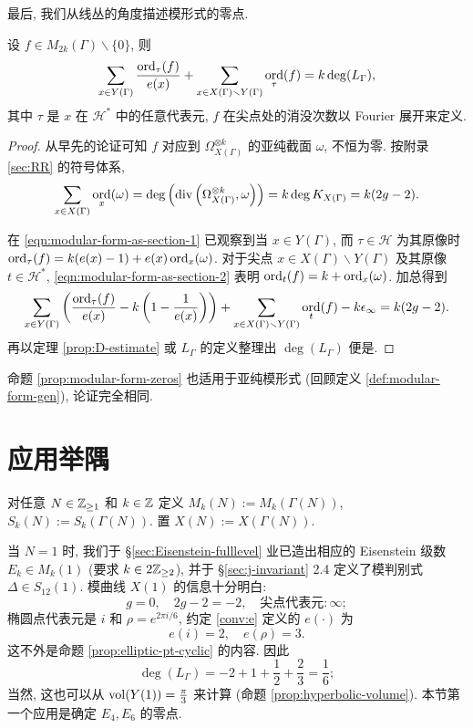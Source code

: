 最后, 我们从线丛的角度描述模形式的零点.
\begin{proposition}\label{prop:modular-form-zeros}
	设 $f \in M_{2k}(\Gamma) \smallsetminus \{0\}$, 则
	\[ \sum_{x \in Y(\Gamma)} \dfrac{\operatorname*{ord}_\tau(f)}{e(x)} + \sum_{x \in X(\Gamma) \smallsetminus Y(\Gamma)} \operatorname*{ord}_\tau(f) = k \deg(L_\Gamma), \]
	其中 $\tau$ 是 $x$ 在 $\mathcal{H}^*$ 中的任意代表元, $f$ 在尖点处的消没次数以 Fourier 展开来定义.
\end{proposition}
\begin{proof}
	从早先的论证可知 $f$ 对应到 $\Omega_{X(\Gamma)}^{\otimes k}$ 的亚纯截面 $\omega$, 不恒为零. 按附录 \ref{sec:RR} 的符号体系,
	\[ \sum_{x \in X(\Gamma)} \operatorname*{ord}_x(\omega) = \deg \left(\operatorname{div}\left( \Omega_{X(\Gamma)}^{\otimes k}, \omega \right)\right) = k \deg K_{X(\Gamma)} = k(2g-2). \]

	在 \eqref{eqn:modular-form-as-section-1} 已观察到当 $x \in Y(\Gamma)$, 而 $\tau \in \mathcal{H}$ 为其原像时 $\operatorname*{ord}_\tau(f) = k(e(x)-1) + e(x) \operatorname*{ord}_x(\omega)$. 对于尖点 $x \in X(\Gamma) \smallsetminus Y(\Gamma)$ 及其原像 $t \in \mathcal{H}^*$, \eqref{eqn:modular-form-as-section-2} 表明 $\operatorname*{ord}_t(f) = k + \operatorname*{ord}_x(\omega)$. 加总得到
	\[ \sum_{x \in Y(\Gamma)} \left( \dfrac{\operatorname*{ord}_\tau(f)}{e(x)} - k\left( 1 - \dfrac{1}{e(x)} \right)\right) + \sum_{x \in X(\Gamma) \smallsetminus Y(\Gamma)} \operatorname*{ord}_t(f) - k \epsilon_\infty = k(2g - 2). \]
	再以定理 \ref{prop:D-estimate} 或 $L_\Gamma$ 的定义整理出 $\deg(L_\Gamma)$ 便是.
\end{proof}

命题 \ref{prop:modular-form-zeros} 也适用于亚纯模形式 (回顾定义 \ref{def:modular-form-gen}), 论证完全相同.

\section{应用举隅}\label{sec:dimension-full}
对任意 $N \in \mathbb{Z}_{\geq 1}$ 和 $k \in \mathbb{Z}$ 定义 $M_k(N) := M_k(\Gamma(N))$, $S_k(N) := S_k(\Gamma(N))$. 置 $X(N) := X(\Gamma(N))$.

当 $N=1$ 时, 我们于 \S\ref{sec:Eisenstein-fulllevel} 业已造出相应的 Eisenstein 级数 $E_k \in M_k(1)$ (要求 $k \in 2\mathbb{Z}_{\geq 2}$), 并于 \S\ref{sec:j-invariant} 2.4 定义了模判别式 $\Delta \in S_{12}(1)$. 模曲线 $X(1)$ 的信息十分明白:
\[ g = 0, \quad 2g - 2 = -2, \quad \text{尖点代表元}: \infty; \]
椭圆点代表元是 $i$ 和 $\rho = e^{2\pi i/6}$, 约定 \ref{conv:e} 定义的 $e(\cdot)$ 为
\[ e(i) = 2, \quad e(\rho) = 3. \]
这不外是命题 \ref{prop:elliptic-pt-cyclic} 的内容. 因此
\[ \deg(L_\Gamma) = -2 + 1 + \frac{1}{2} + \frac{2}{3} = \frac{1}{6}; \]
当然, 这也可以从 $\operatorname{vol}(Y(1)) = \frac{\pi}{3}$ 来计算 (命题 \ref{prop:hyperbolic-volume}). 本节第一个应用是确定 $E_4, E_6$ 的零点.

